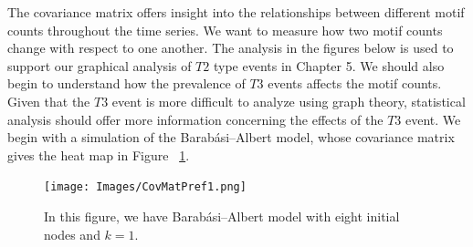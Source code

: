 \vspace{1cm}


%
The covariance matrix offers insight into the relationships between different motif counts throughout the time series.
We want to measure how two motif counts change with respect to one another. The analysis in the figures below is used
to support our graphical analysis of $T2$ type events in Chapter 5. We should also begin to understand how 
the prevalence of $T3$ events affects the motif counts. Given that the $T3$ event is more difficult to analyze using
graph theory, statistical analysis should offer more information concerning the effects of the $T3$ event. We begin with a simulation of the Barabási–Albert model,
whose covariance matrix gives the heat map in Figure ~\ref{fig:BAcov1}.



\begin{figure}
    \texttt{[image: Images/CovMatPref1.png]}\
    \centering
    \caption{In this figure, we have Barabási–Albert model with eight initial nodes and $k =1$.}
    \label{fig:BAcov1}
\end{figure}

\FloatBarrier

